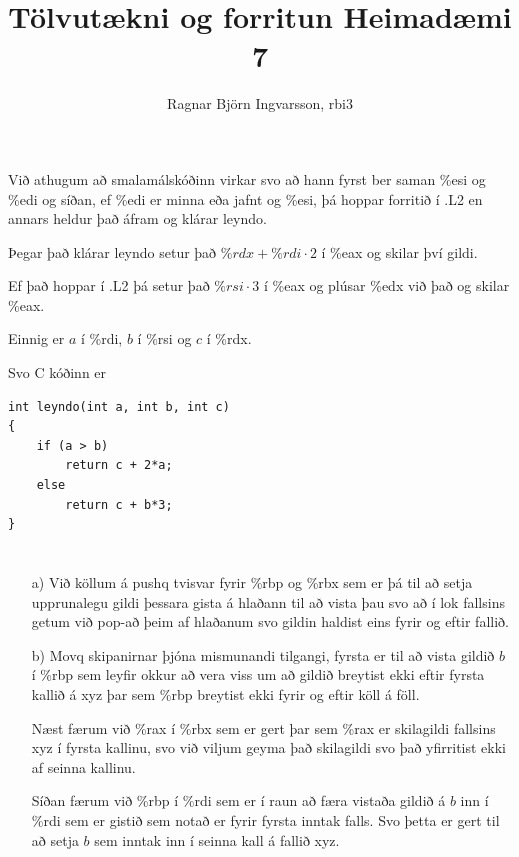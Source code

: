 \documentclass{article}
\title{Tölvutækni og forritun Heimadæmi 7}
\author{Ragnar Björn Ingvarsson, rbi3}
\begin{document}
\renewcommand\thepage{}
	
	\maketitle

	\newpage
	\setcounter{page}{1}
	\renewcommand\thepage{\arabic{page}}

	\section{}

	Við athugum að smalamálskóðinn virkar svo að hann fyrst ber saman \%esi 
	og \%edi og síðan, ef \%edi er minna eða jafnt og \%esi, þá hoppar 
	forritið í .L2 en annars heldur það áfram og klárar leyndo.

	Þegar það klárar leyndo setur það $\%rdx + \%rdi \cdot 2$ í \%eax og 
	skilar því gildi.

	Ef það hoppar í .L2 þá setur það $\%rsi \cdot 3$ í \%eax og plúsar \%edx 
	við það og skilar \%eax.

	Einnig er $a$ í \%rdi, $b$ í \%rsi og $c$ í \%rdx.

	Svo C kóðinn er 

	\begin{verbatim}
int leyndo(int a, int b, int c)
{
    if (a > b)
        return c + 2*a;
    else
        return c + b*3;
}
	\end{verbatim}

	\section{}

	\begin{itemize}
		\item[a)] Við köllum á pushq tvisvar fyrir \%rbp og \%rbx sem er þá 
			til að setja upprunalegu gildi þessara gista á hlaðann til að 
			vista þau svo að í lok fallsins getum við pop-að þeim af hlaðanum 
			svo gildin haldist eins fyrir og eftir fallið.
		\item[b)] Movq skipanirnar þjóna mismunandi tilgangi, fyrsta er til 
			að vista gildið $b$ í \%rbp sem leyfir okkur að vera viss um að 
			gildið breytist ekki eftir fyrsta kallið á xyz þar sem \%rbp 
			breytist ekki fyrir og eftir köll á föll.

			Næst færum við \%rax í \%rbx sem er gert þar sem \%rax er 
			skilagildi fallsins xyz í fyrsta kallinu, svo við viljum geyma 
			það skilagildi svo það yfirritist ekki af seinna kallinu. 

			Síðan færum við \%rbp í \%rdi sem er í raun að færa vistaða 
			gildið á $b$ inn í \%rdi sem er gistið sem notað er fyrir fyrsta 
			inntak falls. Svo þetta er gert til að setja $b$ sem inntak inn 
			í seinna kall á fallið xyz.
	\end{itemize}
\end{document}
